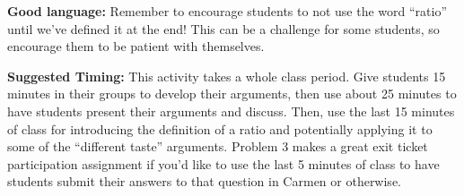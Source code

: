 \documentclass{ximera}
\begin{document}
\begin{instructorNotes}
{\bf Good language:} Remember to encourage students to not use the word ``ratio'' until we've defined it at the end! This can be a challenge for some students, so encourage them to be patient with themselves.


{\bf Suggested Timing:} This activity takes a whole class period. Give students 15 minutes in their groups to develop their arguments, then use about 25 minutes to have students present their arguments and discuss. Then, use the last 15 minutes of class for introducing the definition of a ratio and potentially applying it to some of the ``different taste'' arguments. Problem 3 makes a great exit ticket participation assignment if you'd like to use the last 5 minutes of class to have students submit their answers to that question in Carmen or otherwise.



\end{instructorNotes}
\end{document}
